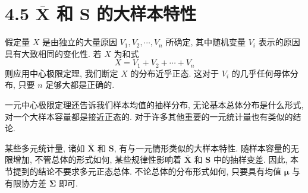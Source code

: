 \section{4.5 $\bar{\mathbf{X}}$ 和 $\mathbf{S}$ 的大样本特性}
\label{sec:4.5}

假定量 $X$ 是由独立的大量原因 $V_{1},V_{2},\cdots,V_{n}$ 所确定, 其中随机变量 $V_{i}$ 表示的原因具有大致相同的变化性. 若 $X$ 为和式
\[
X=V_{1}+V_{2}+\cdots+V_{n}
\]
则应用中心极限定理, 我们断定 $X$ 的分布近乎正态. 这对于 $V_{i}$ 的几乎任何母体分布, 只要 $n$ 足够大都是正确的.

一元中心极限定理还告诉我们样本均值的抽样分布, 无论基本总体分布是什么形式, 对一个大样本容量都是接近正态的. 对于许多其他重要的一元统计量也有类似的结论.

某些多元统计量, 诸如 $\bar{\mathbf{X}}$ 和 $\mathbf{S}$, 有与一元情形类似的大样本特性. 随样本容量的无限增加, 不管总体的形式如何, 某些规律性影响着 $\bar{\mathbf{X}}$ 和 $\mathbf{S}$ 中的抽样变差. 因此, 本节提到的结论不要求多元正态总体. 不论总体的分布形式如何, 只要具有均值 $\boldsymbol{\mu}$ 与有限协方差 $\boldsymbol{\Sigma}$ 即可.
